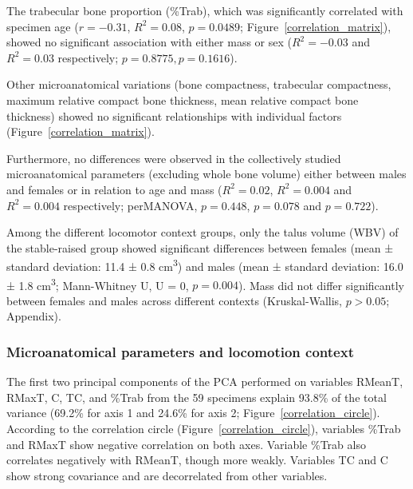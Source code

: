 \documentclass[12pt,a4paper]{article}
\begin{document}
The trabecular bone proportion (\%Trab), which was significantly correlated with specimen age ($r = -0.31$, $R^2 = 0.08$, $p = 0.0489$; Figure~\ref{correlation_matrix}), showed no significant association with either mass or sex ($R^2 = -0.03$ and $R^2 = 0.03$ respectively; $p = 0.8775, p = 0.1616$).

Other microanatomical variations (bone compactness, trabecular compactness, maximum relative compact bone thickness, mean relative compact bone thickness) showed no significant relationships with individual factors (Figure~\ref{correlation_matrix}). 

Furthermore, no differences were observed in the collectively studied microanatomical parameters (excluding whole bone volume) either between males and females or in relation to age and mass ($R^2 = 0.02$, $R^2 = 0.004$ and $R^2 = 0.004$ respectively; perMANOVA, $p = 0.448$, $p = 0.078$ and $p = 0.722$).

Among the different locomotor context groups, only the talus volume (WBV) of the stable-raised group showed significant differences between females (mean ± standard deviation: 11.4 ± 0.8 cm\textsuperscript{3}) and males (mean ± standard deviation: 16.0 ± 1.8 cm\textsuperscript{3}; Mann-Whitney U, U = 0, $p = 0.004$). Mass did not differ significantly between females and males across different contexts (Kruskal-Wallis, $p > 0.05$; Appendix).

\subsubsection{Microanatomical parameters and locomotion context}
The first two principal components of the PCA performed on variables RMeanT, RMaxT, C, TC, and \%Trab from the 59 specimens explain 93.8\% of the total variance (69.2\% for axis 1 and 24.6\% for axis 2; Figure~\ref{correlation_circle}). According to the correlation circle (Figure~\ref{correlation_circle}), variables \%Trab and RMaxT show negative correlation on both axes. Variable \%Trab also correlates negatively with RMeanT, though more weakly. Variables TC and C show strong covariance and are decorrelated from other variables. 
\end{document}
